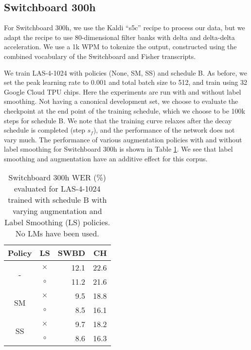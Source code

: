\subsection{Switchboard 300h} \label{ss:swbd}

For Switchboard 300h, we use the Kaldi \cite{povey-asru-2011} ``s5c'' recipe to process our data, but we adapt the recipe to use 80-dimensional filter banks with delta and delta-delta acceleration. We use a 1k WPM \cite{schuster-icassp-2012} to tokenize the output, constructed using the combined vocabulary of the Switchboard and Fisher transcripts.

We train LAS-4-1024 with policies (None, SM, SS) and schedule B. As before, we set the peak learning rate to $0.001$ and total batch size to 512, and train using 32 Google Cloud TPU chips. Here the experiments are run with and without label smoothing. Not having a canonical development set, we choose to evaluate the checkpoint at the end point of the training schedule, which we choose to be 100k steps for schedule B. We note that the training curve relaxes after the decay schedule is completed (step $s_f$), and the performance of the network does not vary much. The performance of various augmentation policies with and without label smoothing for Switchboard 300h is shown in Table \ref{t:SWBD}. We see that label smoothing and augmentation have an additive effect for this corpus.

\begin{table}[h!]
  \vskip -0.1in
  \caption{Switchboard 300h WER (\%) evaluated for LAS-4-1024 trained with schedule B with varying augmentation and Label Smoothing (LS) policies. No LMs have been used.}
  \footnotesize
  \label{t:SWBD}
  \centering
  \begin{tabular}{ccrr}
    \toprule
    {\bfseries Policy} & {\bfseries LS} & {\bfseries SWBD} & {\bfseries CH} \\
    \midrule
    \multirow{2}{*}{-} & $\times$ & 12.1 & 22.6 \\
    & $\circ$ & 11.2 & 21.6 \\
    \midrule
    \multirow{2}{*}{SM}& $\times$ & 9.5 & 18.8 \\
    & $\circ$ & 8.5 & 16.1 \\
    \midrule
    \multirow{2}{*}{SS} & $\times$ & 9.7 & 18.2 \\
    & $\circ$ & 8.6 & 16.3 \\
    \bottomrule
  \end{tabular}
\end{table}

